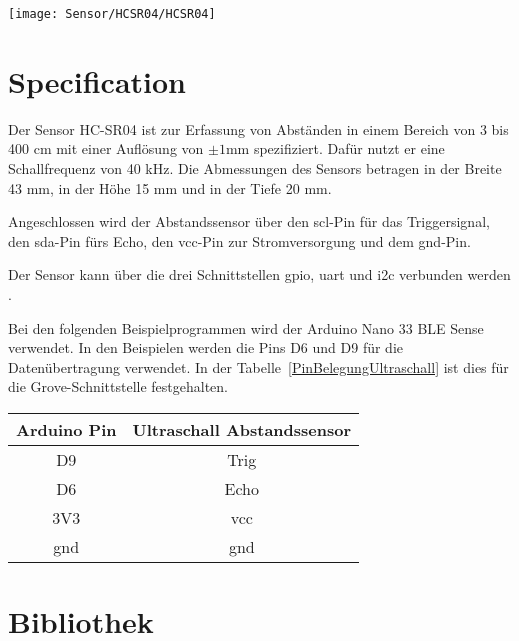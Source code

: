     \begin{center}
        \texttt{[image: Sensor/HCSR04/HCSR04]}
        \label{Ultraschall Abstandssensor}
    \end{center}


\section{Specification}

 Der Sensor HC-SR04 ist  zur Erfassung von Abständen in einem Bereich von 3 bis 400 cm mit einer Auflösung von $\pm 1$mm spezifiziert. Dafür nutzt er eine Schallfrequenz von 40 kHz.   Die Abmessungen des Sensors betragen in der Breite 43 mm, in der Höhe 15 mm und in der Tiefe 20 mm. 
 
 Angeschlossen wird der Abstandssensor über den \ac{scl}-Pin für das Triggersignal, den \ac{sda}-Pin fürs Echo, den \ac{vcc}-Pin zur Stromversorgung und dem \ac{gnd}-Pin. 
 
 Der Sensor kann über die drei Schnittstellen \ac{gpio}, \ac{uart} und \ac{i2c} verbunden werden \cite{Simac:2017}. 


Bei den folgenden Beispielprogrammen wird der Arduino Nano 33 BLE Sense verwendet. In den Beispielen werden die Pins D6 und D9 für die Datenübertragung verwendet. In der Tabelle~\ref{PinBelegungUltraschall}  ist dies für die Grove-Schnittstelle festgehalten.

    \begin{center}
        \begin{tabular}{c|c}
            Arduino Pin & Ultraschall Abstandssensor\\ \hline
            D9 & Trig\\
            D6 & Echo\\
            3V3 & \acs{vcc}\\
            \acs{gnd} & \acs{gnd}\\
        \end{tabular}
        \label{PinBelegungUltraschall}
    \end{center}



\section{Bibliothek}

